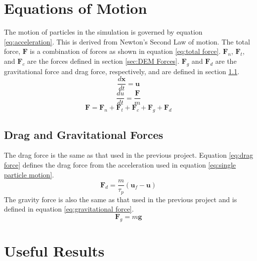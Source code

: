 \documentclass[10pt,a4paper,titlepage]{report}
\begin{document}
\section{Equations of Motion}
The motion of particles in the simulation is governed by equation \ref{eq:acceleration}. This is derived from Newton's Second Law of motion. The total force, $\mathbf{F}$ is a combination of forces as shown in equation \ref{eq:total force}. $\mathbf{F}_{n}$, $\mathbf{F}_{t}$, and $\mathbf{F}_{c}$ are the forces defined in section \ref{sec:DEM Forces}. $\mathbf{F}_{g}$ and $\mathbf{F}_{d}$ are the gravitational force and drag force, respectively, and are defined in section \ref{sec:drag and gravity}.
\begin{equation}
\dfrac{d\mathbf{x}}{dt} = \mathbf{u}
\label{eq:position}
\end{equation}
\begin{equation}
\dfrac{du}{dt} = \dfrac{\mathbf{F}}{m}
\label{eq:acceleration}
\end{equation}
\begin{equation}
\mathbf{F} = \mathbf{F}_{n} + \mathbf{F}_{t} + \mathbf{F}_{c} + \mathbf{F}_{g} + \mathbf{F}_{d}
\label{eq:total force}
\end{equation}
\subsection{Drag and Gravitational Forces}
\label{sec:drag and gravity}
The drag force is the same as that used in the previous project. Equation \ref{eq:drag force} defines the drag force from the acceleration used in equation \ref{eq:single particle motion}.
\begin{equation}
\label{eq:drag force}
\mathbf{F}_{d} = \dfrac{m}{\tau_p} (\mathbf{u}_f - \mathbf{u})
\end{equation}
The gravity force is also the same as that used in the previous project and is defined in equation \ref{eq:gravitational force}.
\begin{equation}
\label{eq:gravitational force}
\mathbf{F}_{g} = m \mathbf{g}
\end{equation}
\section{Useful Results}
\end{document}
